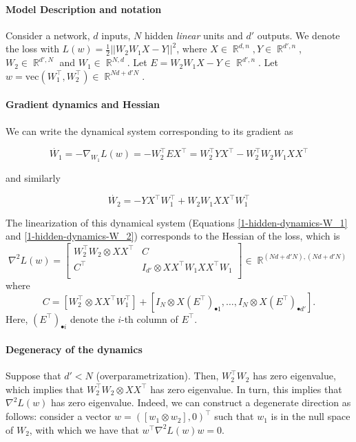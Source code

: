 \documentclass[10pt]{article}
\DeclareMathOperator{\R}{\mathbb{R}}
\newcommand{\vect}{\mathrm{vec}}
\begin{document}
\paragraph{Model Description and notation}
Consider a network, $d$ inputs, $N$
hidden {\it linear} units and $d'$ outputs. 
We denote
the loss with $L(w)=\frac{1}{2}||W_2W_1 X-Y||^2$, where
$X \in \R^{d, n}, Y \in \R^{d',n}$, $W_2 \in \R^{d',N}$ and
$W_1 \in \R^{N,d}$. Let $E = W_2 W_1 X -Y \in \R^{d',n}$. Let $w=\vect(W_1^\top, W_2^\top)\in \R^{Nd+d'N}$.

\paragraph{Gradient dynamics and Hessian}


We can write the dynamical system corresponding to its gradient as


\begin{equation}
\dot{W_1} = - \nabla_{W_1} L(w)= - W_2^\top  E X^\top =
W_2^\top YX^\top -  W_2^\top W_2W_1 X X^\top
\label{1-hidden-dynamics-W_1}
\end{equation}

\noindent and similarly

\begin{equation}
\dot{W_2}= - YX^\top W_1^\top +  W_2W_1XX^\top W_1^\top
\label{1-hidden-dynamics-W_2}
\end{equation}


The linearization of this dynamical system (Equations
\ref{1-hidden-dynamics-W_1} and \ref{1-hidden-dynamics-W_2})
corresponds to the Hessian of the  loss, which is 
$$
 \nabla^2 L(w) =
\begin{bmatrix}
W^{\top}_2W_2 \otimes XX^\top & C \\
C^{\top} & I_{d'} \otimes XX^\top W_1 XX^\top W_1 \\
\end{bmatrix}
\in \R^{(Nd+d'N), (Nd+d'N)}
$$
where
$$
C = [W_{2}^\top \otimes XX^\top W_1^\top ]+  [I_N \otimes X (E^\top)_{\bullet 1}, \dots, I_N \otimes X (E^\top)_{\bullet d'}].
$$
Here, $(E^\top)_{\bullet i}$ denote the $i$-th column of $E^\top$. 

\paragraph{Degeneracy of the dynamics}

Suppose that $d' <N$ (overparametrization). Then, $W^{\top}_2W_2$ has zero eigenvalue, which
implies that $W^{\top}_2W_2 \otimes XX^\top$ has zero eigenvalue. In turn, this 
implies that $\nabla^2 L(w)$ has zero eigenvalue. Indeed, we can
construct a degenerate direction as follows: consider a vector
$w=([w_1\otimes w_2],0)^\top$ such that $w_1$ is in the null space of
$W_2$, with which we have that $w^\top\nabla^2 L(w)w=0$.
\end{document}
